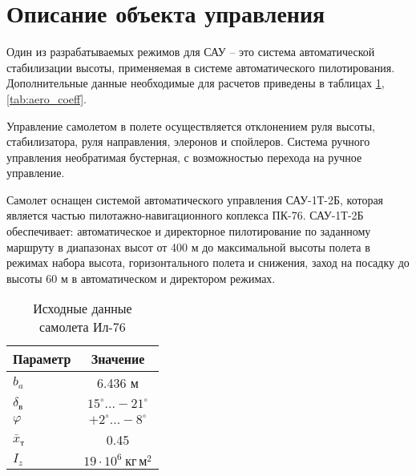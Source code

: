 \section{Описание объекта управления}

Один из разрабатываемых режимов для САУ -- это система автоматической
стабилизации высоты, применяемая в системе автоматического пилотирования.
Дополнительные данные необходимые для расчетов приведены в таблицах \ref{tab:data},
\ref{tab:aero_coeff}. 

Управление самолетом в полете осуществляется отклонением руля высоты,
стабилизатора, руля направления, элеронов и спойлеров. Система ручного
управления необратимая бустерная, с возможностью перехода на ручное управление. 

Самолет оснащен системой автоматического управления САУ-1Т-2Б, которая является
частью пилотажно-навигационного коплекса ПК-76. САУ-1Т-2Б обеспечивает:
автоматическое и директорное пилотирование по заданному маршруту в диапазонах
высот от 400 м до максимальной высоты полета в режимах набора высота,
горизонтального полета и снижения, заход на посадку до высоты 60 м в
автоматическом и директором режимах.


\begin{table}[H]
    \centering
    \caption{Исходные данные самолета Ил-76}
    \label{tab:data}
    \begin{tabular}{|p{}|c|}
        \hline
        Параметр & Значение \\ 
        \hline
        $b_a$ & 6.436 м \\
        \hline
        $ \delta_в$ & $15^\circ ... -21^\circ$\\
        \hline
        $\varphi$ & $ +2^\circ ... -8^\circ$ \\
        \hline
        $\bar{x}_\text{т}$ & 0.45 \\
        \hline
        $I_z$ & $ 19\cdot10^6 \ \text{кг}\,\text{м}^2$\\
        \hline
    \end{tabular}
\end{table}

